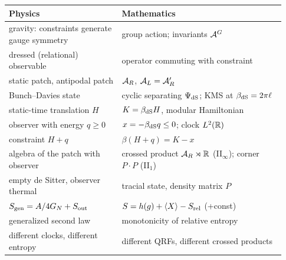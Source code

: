\begin{dictbox}
\renewcommand{\arraystretch}{1.3}
\begin{tabular}{@{}p{0.38\linewidth}p{0.55\linewidth}@{}}
\textbf{Physics} & \textbf{Mathematics}\\
\hline
gravity: constraints generate gauge symmetry & group action; invariants $\mathcal{A}^G$\\
dressed (relational) observable & operator commuting with constraint\\
static patch, antipodal patch & $\mathcal{A}_R$, $\mathcal{A}_L=\mathcal{A}_R'$\\
Bunch--Davies state & cyclic separating $\Psi_{\rm dS}$; KMS at $\beta_{\rm dS}=2\pi\ell$\\
static-time translation $H$ & $K=\beta_{\rm dS}H$, modular Hamiltonian\\
observer with energy $q\ge0$ & $x=-\beta_{\rm dS}q\le0$; clock $L^2(\mathbb{R})$\\
constraint $H+q$ & $\beta(H+q)=K-x$\\
algebra of the patch with observer & crossed product $\mathcal{A}_R\rtimes\mathbb{R}$ (II$_\infty$); corner $P\cdot P$ (II$_1$)\\
empty de Sitter, observer thermal & tracial state, density matrix $P$\\
$S_{\mathrm{gen}}=A/4G_N+S_{\rm out}$ & $S=h(g)+\langle X\rangle-S_{\rm rel}$ (+const)\\
generalized second law & monotonicity of relative entropy\\
different clocks, different entropy & different QRFs, different crossed products\\
\end{tabular}
\end{dictbox}
